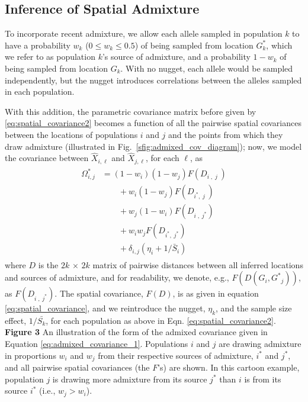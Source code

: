 \documentclass[10pt,letterpaper]{article}
\newcommand{\kadmixsource}[1]{{$G^{*}_{#1}$}}
\newcommand{\identifyadmixsource}[1]{{#1^{*}}}
\begin{document}
\subsection*{Inference of Spatial Admixture}

To incorporate recent admixture, 
we allow each allele sampled in population $k$ to have a probability $w_k$ ($0 \leq w_k \leq 0.5$) of being sampled from location \kadmixsource{k},
which we refer to as population $k$'s source of admixture,
and a probability $1-w_k$ of being sampled from location $G_k$.
With no nugget, each allele would be sampled independently, but the nugget introduces correlations between the alleles sampled in each population.

With this addition, the parametric covariance matrix before given by \eqref{eq:spatial_covariance2}
becomes a function of all the pairwise spatial covariances between the locations of populations $i$ and $j$ and the points from which they draw admixture 
(illustrated in Fig.\ \ref{sfig:admixed_cov_diagram});
now, we model the covariance between $\hat X_{i,\ell}$ and $\hat X_{j,\ell}$, for each $\ell$, as
\begin{align}
\label{eq:admixed_covariance_1}\begin{split}
\identifyadmixsource{\Omega_{i,j}} 
    &= 
  (1-w_i)(1-w_j) F(D_{i\;,\;j\;}) \\
  &\qquad {} + w_i(1-w_j) F(D_{\identifyadmixsource{i},\;j\;})    \\
  &\qquad {} + w_j(1-w_i) F(D_{i\;,\;\identifyadmixsource{j}})    \\
  &\qquad {} + w_i w_j F(D_{\identifyadmixsource{i},\;\identifyadmixsource{j}})    \\
  &\qquad {} + \delta_{i,j} (\eta_i + 1 / \bar{S}_i) 
\end{split}
\end{align}
where $D$ is the $2k \, \times \, 2k$ matrix of pairwise distances between all inferred locations and sources of admixture, 
and for readability, we denote, e.g., $F(D(G_i,\identifyadmixsource{G}_j))$, as $F(D_{i\;,\;\identifyadmixsource{j}})$.
The spatial covariance, $F(D)$, is as given in equation \eqref{eq:spatial_covariance}, and we reintroduce the nugget, $\eta_k$, and the sample size effect, $1/\bar{S_k}$, for each population as above in Eqn. \eqref{eq:spatial_covariance2}.
%
\newline\newline
{\bf{Figure 3}} An illustration of the form of the admixed covariance given in Equation \eqref{eq:admixed_covariance_1}.  Populations $i$ and $j$ are drawing admixture in proportions $w_i$ and $w_j$ from their respective sources of admixture, $\identifyadmixsource{i}$ and $\identifyadmixsource{j}$, and all pairwise spatial covariances (the $F$'s) are shown.  In this cartoon example, population $j$ is drawing more admixture from its source $\identifyadmixsource{j}$ than $i$ is from its source $\identifyadmixsource{i}$ (i.e., $w_j > w_i$).
\newline\newline
\end{document}

